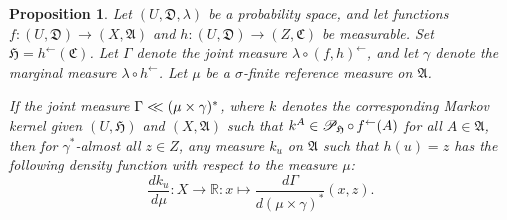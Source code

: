 \documentclass[
twoside=true,
paper=letter,
fontsize=9pt,
pagesize=auto,
leqno,
openany,
headsepline,
overfullrule,
]{scrbook}
\theoremstyle{plain}
\theoremstyle{plain}
\newtheorem{prop}[thm]{Proposition}
\theoremstyle{definition}
\theoremstyle{bfnoteitalic}
\theoremstyle{bfnoteroman}
\newcommand{\sigalg}[1]{\mathfrak{#1}}
\newcommand{\cali}[1]{\mathscr{#1}}
\newcommand{\condprobop}[1]{\mathop{\cali{P}\hspace{-1pt}}\nolimits_{#1}}
\newcommand{\textsigma}{\hbox{\large{$\sigma$}}\kern-1pt}
\newcommand{\preimage}[1]{#1^{\leftarrow}}
\newcommand{\R}{\mathbb{R}}
\newcommand{\sigmaalgebra}{\sigalg{A}}
\newcommand{\sigmaalgebraiii}{\sigalg{C}}
\newcommand{\funch}{h}
\newcommand{\funck}{k}
\newcommand{\function}{f}
\newcommand{\functioniii}{h}
\newcommand{\measurespace}{X}
\newcommand{\measurespaceiii}{Z}
\newcommand{\mspaceelt}{x}
\newcommand{\mspaceeltiii}{z}
\newcommand{\abscont}{\mathrel{< \kern-3.5pt <}}
\newcommand{\measure}{\mu}
\newcommand{\measmu}{\mu}
\newcommand{\measureiii}{\lambda}
\newcommand{\measlambda}{\lambda}
\newcommand{\seti}{A}
\newcommand{\uspace}{U}%
\newcommand{\uspaceelt}{u}
\newcommand{\uspacesig}{\sigalg{D}}
\newcommand{\measonprod}{\Gamma}%
\newcommand{\marginalthree}{\gamma}
\begin{document}
\begin{prop}\label{conditional_density}
Let
$(\uspace, \uspacesig, \measureiii)$
be a probability space, and let functions
$\function:(\uspace,\uspacesig)\to (\measurespace,\sigmaalgebra)$
and
$\functioniii:(\uspace,\uspacesig)\to (\measurespaceiii,\sigmaalgebraiii)$
be measurable. Set
$\sigalg{H} = \preimage{\functioniii}(\sigmaalgebraiii)$.
Let $\measonprod$ denote the joint measure $\measureiii\circ\preimage{(\function,\functioniii)}$,
and let $\marginalthree$ denote the marginal measure $\measlambda\circ\preimage{\funch}$.
Let $\measmu$ be a \textsigma\hyp{}finite reference measure on
$\sigmaalgebra$.

If the joint measure
$\measonprod\abscont (\measmu\times\marginalthree)^*$, where
$\funck$
denotes the corresponding Markov kernel given
$(\uspace,\sigalg{H})$ and $(\measurespace,\sigmaalgebra)$ such that
$\funck^\seti\in
\condprobop{\sigalg{H}}\circ\, \preimage{\function}(\seti)$
for all $\seti\in\sigmaalgebra$,
then
for $\marginalthree^*$\hyp{}almost all $\mspaceeltiii\in\measurespaceiii$, any measure
$\funck_\uspaceelt$
on $\sigmaalgebra$ such that $\funch(\uspaceelt) = \mspaceeltiii$
has the following density function with respect to the measure
$\measure$:
\[
\frac{d \funck_\uspaceelt}{d \measure}
:\measurespace\to\R
:\mspaceelt\mapsto
\frac{d\measonprod}{d(\measure\times\marginalthree)^*}
( \mspaceelt,\mspaceeltiii ).
\]
\end{prop}
\end{document}
